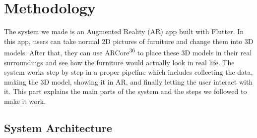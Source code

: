 \documentclass[12pt, a4paper]{article}
\begin{document}
\section{Methodology}

The system we made is an Augmented Reality (AR) app built with Flutter. In this app, users can take normal 2D pictures of furniture and change them into 3D models. After that, they can use ARCore\textsuperscript{36} to place these 3D models in their real surroundings and see how the furniture would actually look in real life. The system works step by step in a proper pipeline which includes collecting the data, making the 3D model, showing it in AR, and finally letting the user interact with it. This part explains the main parts of the system and the steps we followed to make it work.

\subsection{System Architecture}
\end{document}
